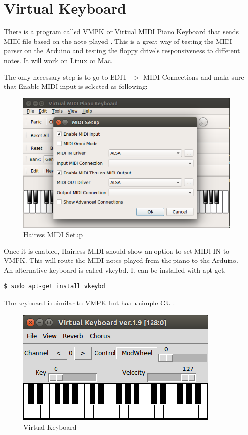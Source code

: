 \documentclass[11pt, a4paper]{report}
\begin{document}
\section{Virtual Keyboard}

There is a program called VMPK or Virtual MIDI Piano Keyboard that sends MIDI file based on the note played \cite{VMPK}. This is a great way of testing the MIDI parser on the Arduino and testing the floppy drive's responsiveness to different notes. It will work on Linux or Mac.  

The only necessary step is to go to EDIT -$>$ MIDI Connections and make sure that Enable MIDI input is selected as following:

\begin{figure}[H]
\hspace*{-2cm}    
    \centering
    \includegraphics[width=.75\textwidth]{HairlessSetup.png}
    \caption{Hairess MIDI Setup}
    \label{fig:hairlesssetup}
\end{figure} 

Once it is enabled, Hairless MIDI should show an option to set MIDI IN to VMPK. This will route the MIDI notes played from the piano to the Arduino. \\

An alternative keyboard is called vkeybd. It can be installed with apt-get.

\begin{lstlisting}[language=bash]
  $ sudo apt-get install vkeybd
\end{lstlisting}

The keyboard is similar to VMPK but has a simple GUI. 

\begin{figure}[H]
\hspace*{-2cm}    
    \centering
    \includegraphics[width=.75\textwidth]{vkeybd.png}
    \caption{Virtual Keyboard}
    \label{fig:vkeybd}
\end{figure} 
\end{document}
